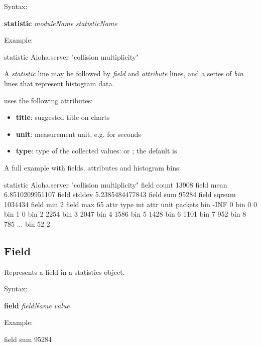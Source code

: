 Syntax:

\hspace{20mm} \textbf{statistic} \textit{moduleName} \textit{statisticName}

Example:

\begin{filelisting}
statistic Aloha.server 	"collision multiplicity"
\end{filelisting}

A \textit{statistic} line may be followed by \textit{field} and \textit{attribute} lines,
and a series of \textit{bin} lines that represent histogram data.

{\opp} uses the following attributes:

\begin{itemize}
    \item \textbf{title}: suggested title on charts
    \item \textbf{unit}: measurement unit, e.g.  for seconds
    \item \textbf{type}: type of the collected values:  or ;
                         the default is 
\end{itemize}

A full example with fields, attributes and histogram bins:

\begin{filelisting}
statistic Aloha.server 	"collision multiplicity"
field count 13908
field mean 6.8510209951107
field stddev 5.2385484477843
field sum 95284
field sqrsum 1034434
field min 2
field max 65
attr type int
attr unit packets
bin	-INF	0
bin	0	0
bin	1	0
bin	2	2254
bin	3	2047
bin	4	1586
bin	5	1428
bin	6	1101
bin	7	952
bin	8	785
...
bin	52	2
\end{filelisting}


\subsection{Field}
\label{sec:result-file-formats:opp:field}

Represents a field in a statistics object.

Syntax:

\hspace{20mm} \textbf{field} \textit{fieldName} \textit{value}

Example:

\begin{filelisting}
field sum 95284
\end{filelisting}


